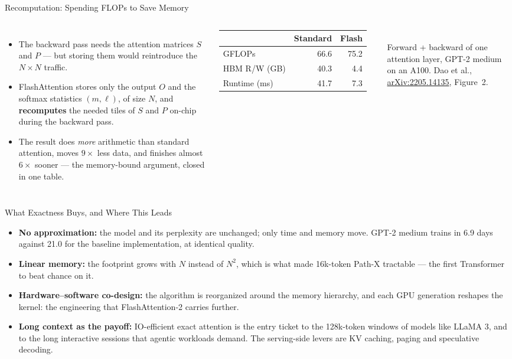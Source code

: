 \begin{frame}{Recomputation: Spending FLOPs to Save Memory}
    \begin{columns}[T,onlytextwidth]
        \begin{itemize}\itemsep0.5em
            \item The backward pass needs the attention matrices $S$ and $P$ --- but storing them would reintroduce the $N \times N$ traffic.
            \item FlashAttention stores only the output $O$ and the softmax statistics $(m, \ell)$, of size $N$, and \textbf{recomputes} the needed tiles of $S$ and $P$ on-chip during the backward pass.
            \item The result does \emph{more} arithmetic than standard attention, moves $9\times$ less data, and finishes almost $6\times$ sooner --- the memory-bound argument, closed in one table.
        \end{itemize}
        \centering
        \vspace{1.5em}
        {\small
        \begin{tabular}{lrr}
            \toprule
            & Standard & Flash \\
            \midrule
            GFLOPs & 66.6 & 75.2 \\
            HBM R/W (GB) & 40.3 & 4.4 \\
            Runtime (ms) & 41.7 & 7.3 \\
            \bottomrule
        \end{tabular}}\\[0.8em]
        {\scriptsize Forward + backward of one attention layer, GPT-2 medium on an A100. Dao et al., \href{https://arxiv.org/abs/2205.14135}{arXiv:2205.14135}, Figure~2.}
    \end{columns}
\end{frame}

\begin{frame}{What Exactness Buys, and Where This Leads}
    \begin{itemize}\itemsep0.4em
        \item \textbf{No approximation:} the model and its perplexity are unchanged; only time and memory move. GPT-2 medium trains in 6.9 days against 21.0 for the baseline implementation, at identical quality.
        \item \textbf{Linear memory:} the footprint grows with $N$ instead of $N^2$, which is what made 16k-token Path-X tractable --- the first Transformer to beat chance on it.
        \item \textbf{Hardware--software co-design:} the algorithm is reorganized around the memory hierarchy, and each GPU generation reshapes the kernel: the engineering that FlashAttention-2 carries further.
        \item \textbf{Long context as the payoff:} IO-efficient exact attention is the entry ticket to the 128k-token windows of models like LLaMA 3, and to the long interactive sessions that agentic workloads demand. The serving-side levers are KV caching, paging and speculative decoding.
    \end{itemize}
\end{frame}
